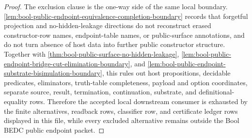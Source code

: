\begin{proof}
The exclusion clause is the one-way side of the same local boundary. \autoref{lem:bool-public-endpoint-equivalence-completion-boundary} records that forgetful projection and no-hidden-leakage directions do not reconstruct erased constructor-row names, endpoint-table names, or public-surface annotations, and do not turn absence of host data into further public constructor structure. Together with \autoref{thm:bool-public-surface-no-hidden-leakage}, \autoref{lem:bool-public-endpoint-bridge-cut-elimination-boundary}, and \autoref{lem:bool-public-endpoint-substrate-bisimulation-boundary}, this rules out host propositions, decidable predicates, eliminators, truth-table completeness, payload and option coordinates, separate source, result, termination, continuation, substrate, and definitional-equality rows. Therefore the accepted local downstream consumer is exhausted by the finite alternatives, readback rows, classifier row, and certificate ledger rows displayed in this file, while every excluded alternative remains outside the Bool BEDC public endpoint packet.
\end{proof}
